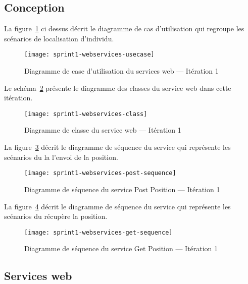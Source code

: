 \subsection{Conception}

La figure~\ref{fig:sprint1-webservices-usecase} ci dessus décrit le diagramme
de cas d'utilisation qui regroupe les scénarios de localisation d'individu.

\begin{figure}[H]
    \centering
    \texttt{[image: sprint1-webservices-usecase]}
    \caption{Diagramme de case d'utilisation du services web --- Itération 1}
\label{fig:sprint1-webservices-usecase}
\end{figure}

Le schéma~\ref{fig:sprint1-webservices-class} présente le diagramme des classes
du service web dans cette itération.

\begin{figure}[htbp]
    \centering
    \texttt{[image: sprint1-webservices-class]}
    \caption{Diagramme de classe du service web --- Itération 1}
\label{fig:sprint1-webservices-class}
\end{figure}


La figure~\ref{fig:sprint1-webservices-post-sequence} décrit le diagramme de
séquence du service  qui représente les scénarios du la
l'envoi de la position.

\begin{figure}[H]
    \centering
    \texttt{[image: sprint1-webservices-post-sequence]}
    \caption{Diagramme de séquence du service Post Position --- Itération 1}
\label{fig:sprint1-webservices-post-sequence}
\end{figure}

La figure~\ref{fig:sprint1-webservices-get-sequence} décrit le diagramme de
séquence du service  qui représente les scénarios du
récupère la position.

\begin{figure}[H]
    \centering
    \texttt{[image: sprint1-webservices-get-sequence]}
    \caption{Diagramme de séquence du service Get Position --- Itération 1}
\label{fig:sprint1-webservices-get-sequence}
\end{figure}

\subsection{Services web}

